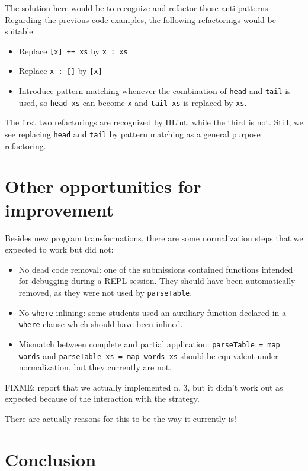 The solution here would be to recognize and refactor those anti-patterns. Regarding the previous code examples, the following refactorings would be suitable:

\begin{itemize}
    \item Replace \texttt{[x] ++ xs} by \texttt{x : xs}
    \item Replace \texttt{x : []} by \texttt{[x]}
    \item Introduce pattern matching whenever the combination of \texttt{head} and \texttt{tail} is used, so \texttt{head xs} can become \texttt{x} and \texttt{tail xs} is replaced by \texttt{xs}.
\end{itemize}

The first two refactorings are recognized by HLint, while the third is not. Still, we see replacing \texttt{head} and \texttt{tail} by pattern matching as a general purpose refactoring.

\section{Other opportunities for improvement}

Besides new program transformations, there are some normalization steps that we expected to work but did not:

\begin{itemize}
    \item No dead code removal: one of the submissions contained functions intended for debugging during a REPL session. They should have been automatically removed, as they were not used by \texttt{parseTable}.
    \item No \texttt{where} inlining: some students used an auxiliary function declared in a \texttt{where} clause which should have been inlined.
    \item Mismatch between complete and partial application: \texttt{parseTable = map words} and \texttt{parseTable xs = map words xs} should be equivalent under normalization, but they currently are not.
\end{itemize}

FIXME: report that we actually implemented n. 3, but it didn't work out as expected because of the interaction with the strategy.

There are actually reasons for this to be the way it currently is!

\section{Conclusion}

